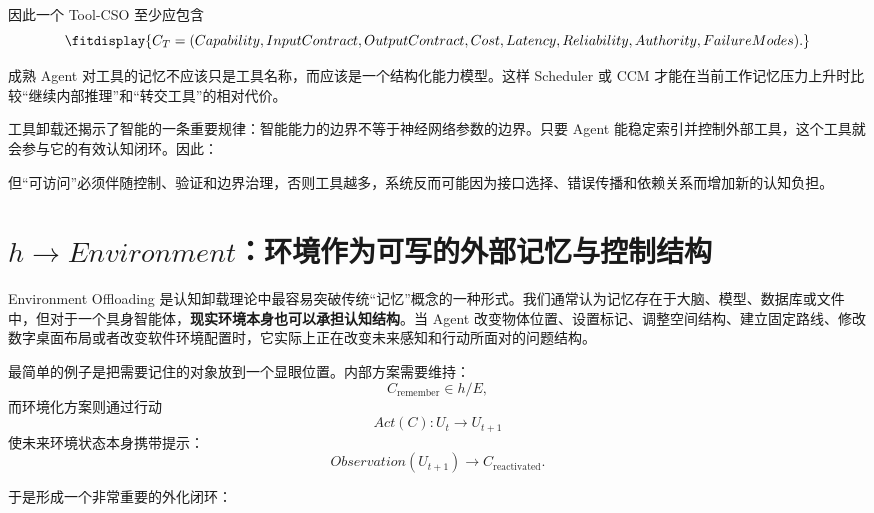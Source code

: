 因此一个 Tool-CSO 至少应包含
\begin{equation}
\fitdisplay{
C_T
=
(
Capability,
InputContract,
OutputContract,
Cost,
Latency,
Reliability,
Authority,
FailureModes
).
}
\end{equation}

成熟 Agent 对工具的记忆不应该只是工具名称，而应该是一个结构化能力模型。这样 Scheduler 或 CCM 才能在当前工作记忆压力上升时比较“继续内部推理”和“转交工具”的相对代价。

工具卸载还揭示了智能的一条重要规律：智能能力的边界不等于神经网络参数的边界。只要 Agent 能稳定索引并控制外部工具，这个工具就会参与它的有效认知闭环。因此：
\begin{statementbox}
\centering
{}
\end{statementbox}
但“可访问”必须伴随控制、验证和边界治理，否则工具越多，系统反而可能因为接口选择、错误传播和依赖关系而增加新的认知负担。

\section{$h\rightarrow Environment$：环境作为可写的外部记忆与控制结构}

Environment Offloading 是认知卸载理论中最容易突破传统“记忆”概念的一种形式。我们通常认为记忆存在于大脑、模型、数据库或文件中，但对于一个具身智能体，\textbf{现实环境本身也可以承担认知结构}。当 Agent 改变物体位置、设置标记、调整空间结构、建立固定路线、修改数字桌面布局或者改变软件环境配置时，它实际上正在改变未来感知和行动所面对的问题结构。

最简单的例子是把需要记住的对象放到一个显眼位置。内部方案需要维持：
\begin{equation}
C_{\mathrm{remember}}
\in h/E,
\end{equation}
而环境化方案则通过行动
\begin{equation}
Act(C)
:
U_t
\rightarrow
U_{t+1}
\end{equation}
使未来环境状态本身携带提示：
\begin{equation}
Observation(U_{t+1})
\rightarrow
C_{\mathrm{reactivated}}.
\end{equation}

于是形成一个非常重要的外化闭环：
\begin{statementbox}
\centering
{}
\end{statementbox}

